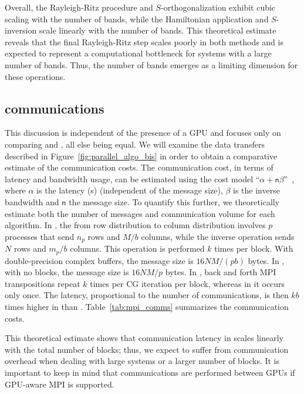 \documentclass[twocolumn,superscriptaddress]{revtex4-1}
\begin{document}
Overall, the Rayleigh-Ritz procedure and $S$-orthogonalization exhibit cubic scaling with the number of bands, while the Hamiltonian application and $S$-inversion scale linearly with the number of bands. This theoretical estimate reveals that the final Rayleigh-Ritz step scales poorly in both methods and is expected to represent a computational bottleneck for systems with a large number of bands. Thus, the number of bands emerges as a limiting dimension for these operations.

\subsection{\mpi communications}

This discussion is independent of the presence of a GPU and focuses only on comparing \lobpcg and \chebyshevfiltering, all else being equal. We will examine the data transfers described in Figure~\ref{fig:parallel_algo_bis} in order to obtain a comparative estimate of the communication costs. The \mpi communication cost, in terms of latency and bandwidth usage, can be estimated using the cost model ``$\alpha+\mathsf n\beta$''~\cite{doi:10.1177/1094342005051521}, where $\alpha$ is the latency (s) (independent of the message size), $\beta$ is the inverse bandwidth and $\mathsf n$ the message size. To quantify this further, we theoretically estimate both the number of messages and communication volume for each algorithm. In \lobpcg, the \alltoall from row distribution to column distribution involves $p$ processes that send $n_p$ rows and $M/b$ columns, while the inverse operation sends $N$ rows and $m_p/b$ columns. This operation is performed $k$ times per block. With double-precision complex buffers, the message size is $16NM/(pb)$ bytes. In \chebyshevfiltering, with no blocks, the message size is $16NM/p$ bytes. In \lobpcg, back and forth MPI transpositions repeat $k$ times per CG iteration per block, whereas in \chebyshevfiltering it occurs only once. The latency, proportional to the number of communications, is then $kb$ times higher in \lobpcg than \chebyshevfiltering. Table~\ref{tab:mpi_comms} summarizes the communication costs.

This theoretical estimate shows that communication latency in \lobpcg scales linearly with the total number of blocks; thus, we expect \lobpcg to suffer from communication overhead when dealing with large systems or a larger number of blocks. It is important to keep in mind that \mpi communications are performed between GPUs if GPU-aware MPI is supported.
\end{document}
